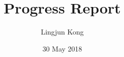 \documentclass{report}
\begin{document}

\title{Progress Report}
\author{Lingjun Kong}
\date{30 May 2018}
\maketitle


\end{document}
